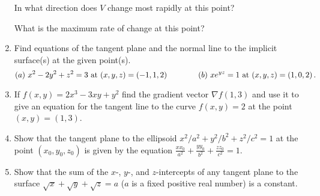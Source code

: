 \documentclass[12pt]{article}
\begin{document}
\begin{enumerate}
  In what direction does $V$ change most rapidly at this point?\vspace{-2pt}

  What is the maximum rate of change at this point?\vspace{-2pt}

    
\item Find equations of the tangent plane and the normal line to the implicit surface(s) at the  given point(s).\vspace{-2pt}
  \[
  (a)\  x^2-2y^2+z^2=3\ \mbox{at }(x,y,z)= (-1,1,2) \qquad\qquad
  (b)\  x e^{yz}=1\ \mbox{at }(x,y,z)= (1,0,2)\,. \vspace{-2pt}
 \]

   
\item If $f(x,y)=2x^3-3xy+y^2$ find the gradient vector $\nabla f(1,3)$ and use it to give an equation for the tangent line
  to the curve $f(x,y)=2$ at the point $(x,y)=(1,3)$.\vspace{-2pt}

   
\item Show that the tangent plane to the ellipsoid $x^2/a^2 + y^2/b^2 + z^2/c^2 =1$ at the point $(x_0,y_0,z_0)$
  is given by the equation  $  \frac{x x_0}{a^2} + \frac{y y_0}{b^2} + \frac{z z_0}{c^2} = 1$. \vspace{-2pt}

   
\item Show that the sum of the $x$-, $y$-, and $z$-intercepts of any tangent plane to the surface
  $\sqrt{x} + \sqrt{y} + \sqrt{z} = a$ ($a$ is a fixed positive real number) is a constant.\vspace{-2pt}


\end{enumerate}
\end{document}
